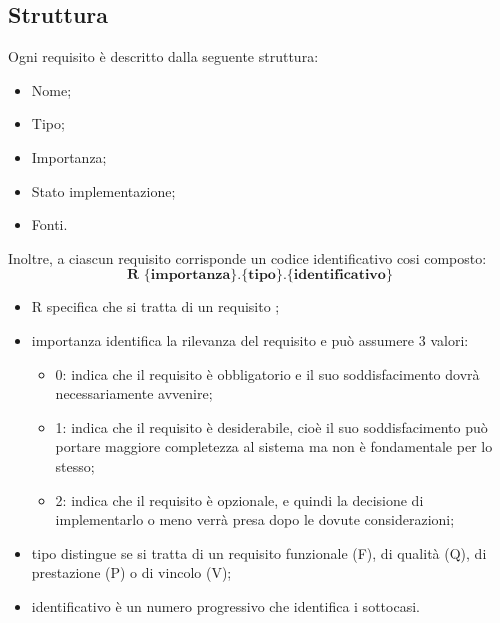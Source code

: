 \subsection{Struttura}
Ogni requisito è descritto dalla seguente struttura:
\begin{itemize}
	\item Nome;
	\item Tipo;
	\item Importanza;
	\item Stato implementazione;
	\item Fonti.
\end{itemize}

Inoltre, a ciascun requisito corrisponde un codice identificativo cosi composto:
$$ \textbf{R \{importanza\}.\{tipo\}.\{identificativo\}  } $$
\begin{itemize}
	\item R specifica che si tratta di un requisito ;
	\item importanza identifica la rilevanza del requisito e può assumere 3 valori:
	\begin{itemize}
		\item 0: indica che il requisito è obbligatorio e il suo soddisfacimento dovrà necessariamente avvenire;
		\item 1: indica che il requisito è desiderabile, cioè il suo soddisfacimento può portare maggiore completezza al sistema ma non è fondamentale per lo stesso;
		\item 2: indica che il requisito è opzionale, e quindi la decisione di implementarlo o meno verrà presa dopo le dovute considerazioni;
	\end{itemize}
	\item tipo distingue se si tratta di un requisito funzionale (F), di qualità (Q), di prestazione (P) o di vincolo (V);
	\item identificativo è un numero progressivo che identifica i sottocasi.
\end{itemize}
